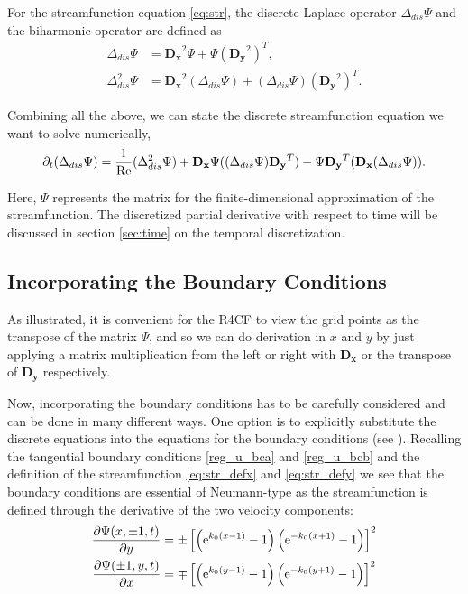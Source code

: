 For the streamfunction equation \eqref{eq:str}, the discrete Laplace operator
$\Delta_{dis} \Psi$ and the biharmonic operator are defined as
\begin{align}
  \Delta_{dis} \Psi &= \mathbf{D_x}^2\Psi + \Psi{(\mathbf{D_y}^2)}^T, \\
  \Delta_{dis}^2 \Psi &= \mathbf{D_x}^2(\Delta_{dis} \Psi) + (\Delta_{dis}
    \Psi){(\mathbf{D_y}^2)}^T. 
\end{align}

Combining all the above, we can state the discrete streamfunction equation we
want to solve numerically,
\vspace{-5pt}
\begin{align}
\partial_t (\Delta_{dis} \Psi) = \frac{1}{\mathrm{Re}} (\Delta_{dis}^2 \Psi)
  + \mathbf{D_x}\Psi((\Delta_{dis}\Psi)\mathbf{D_y}^T)
  - \Psi\mathbf{D_y}^T (\mathbf{D_x}(\Delta_{dis} \Psi)). 
\label{eq:str_dis}
\end{align}

Here, $\Psi$ represents the matrix for the finite-dimensional approximation of
the streamfunction. The discretized partial derivative with respect to time
will be discussed in section \ref{sec:time} on the temporal discretization.

\subsection{Incorporating the Boundary Conditions} \label{sec:bc}

As illustrated, it is convenient for the R4CF to view the grid points as the
transpose of the matrix $\Psi$, and so we can do derivation in $x$ and $y$ by
just applying a matrix multiplication from the left or right with
$\mathbf{D_x}$ or the transpose of $\mathbf{D_y}$ respectively. 

Now, incorporating the boundary conditions has to be carefully considered and
can be done in many different ways. One option is to explicitly substitute the
discrete equations into the equations for the boundary conditions (see
\cite{meseguer2020}). Recalling the tangential boundary conditions
\eqref{reg_u_bca} and \eqref{reg_u_bcb} and the definition of the
streamfunction \eqref{eq:str_defx} and \eqref{eq:str_defy} we see that the
boundary conditions are essential of Neumann-type as the streamfunction is
defined through the derivative of the two velocity components:
\vspace{-5pt}
\begin{align}
\frac{\partial\Psi(x,\pm 1,t)}{\partial y} &= \pm\left[\left(\mathrm{e}^{k_0(x - 1)} - 1\right)
  \left(\mathrm{e}^{-k_0(x + 1)} - 1\right)\right]^2\label{reg_psi_bca} \\
  \frac{\partial\Psi(\pm 1,y,t)}{\partial x} &= \mp\left[\left(\mathrm{e}^{k_0(y - 1)} - 1\right)
  \left(\mathrm{e}^{-k_0(y + 1)} - 1\right)\right]^2\label{reg_psi_bcb}
\end{align}

